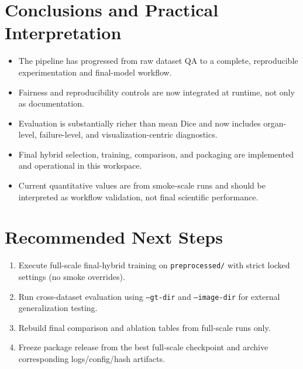 \documentclass[11pt,a4paper]{article}
\begin{document}
\section{Conclusions and Practical Interpretation}
\begin{itemize}[leftmargin=1.5em]
  \item The pipeline has progressed from raw dataset QA to a complete, reproducible experimentation and final-model workflow.
  \item Fairness and reproducibility controls are now integrated at runtime, not only as documentation.
  \item Evaluation is substantially richer than mean Dice and now includes organ-level, failure-level, and visualization-centric diagnostics.
  \item Final hybrid selection, training, comparison, and packaging are implemented and operational in this workspace.
  \item Current quantitative values are from smoke-scale runs and should be interpreted as workflow validation, not final scientific performance.
\end{itemize}

\section{Recommended Next Steps}
\begin{enumerate}[leftmargin=1.5em]
  \item Execute full-scale final-hybrid training on \texttt{preprocessed/} with strict locked settings (no smoke overrides).
  \item Run cross-dataset evaluation using \texttt{--gt-dir} and \texttt{--image-dir} for external generalization testing.
  \item Rebuild final comparison and ablation tables from full-scale runs only.
  \item Freeze package release from the best full-scale checkpoint and archive corresponding logs/config/hash artifacts.
\end{enumerate}
\end{document}
